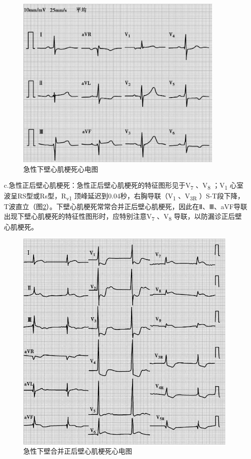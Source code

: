 \begin{figure}[!htbp]
 \centering
 \includegraphics[width=4.05208in,height=3.39583in]{./images/Image00074.jpg}
 \captionsetup{justification=centering}
 \caption{急性下壁心肌梗死心电图}
 \label{fig10-3}
  \end{figure} 

c.急性正后壁心肌梗死：急性正后壁心肌梗死的特征图形见于V\textsubscript{7}
、V\textsubscript{8} ；V\textsubscript{1}
心室波呈RS型或Rs型，R\textsubscript{v1}
顶峰延迟到0.04秒，右胸导联（V\textsubscript{1} 、V\textsubscript{3R}
）S-T段下降，T波直立（图\ref{fig10-4}）。下壁心肌梗死常常合并正后壁心肌梗死，因此在Ⅱ、Ⅲ、aVF导联出现下壁心肌梗死的特征性图形时，应特别注意V\textsubscript{7}
、V\textsubscript{8} 导联，以防漏诊正后壁心肌梗死。

\begin{figure}[!htbp]
 \centering
 \includegraphics[width=4.33333in,height=4.41667in]{./images/Image00075.jpg}
 \captionsetup{justification=centering}
 \caption{急性下壁合并正后壁心肌梗死心电图}
 \label{fig10-4}
  \end{figure} 

